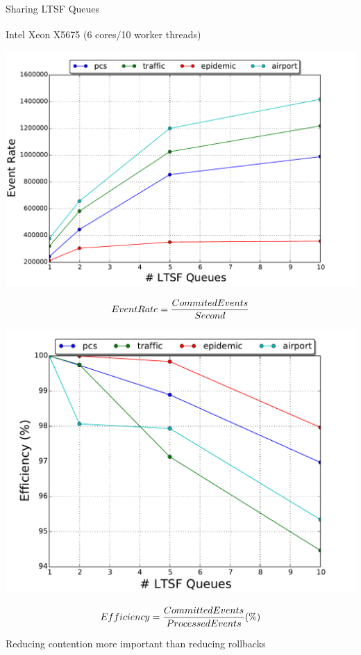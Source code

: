 \documentclass[10pt]{beamer}
\begin{document}
\begin{frame}{Sharing LTSF Queues}
  \bigskip
  \bigskip
    \begin{block}{Intel\textsuperscript{\textregistered} Xeon\textsuperscript{\textregistered} X5675 (6 cores/10 worker threads)}\end{block}
    \vspace*{-\medskipamount}
    \begin{minipage}{0.55\textwidth}
        \centerline{\includegraphics[width=\textwidth]{../figs/pending_event_set/ltsf_event_rate.pdf}}
        \vspace*{-\medskipamount}
        \small{$$EventRate={CommitedEvents \over Second}$$}
    \end{minipage}%
    \begin{minipage}{0.55\textwidth}
        \centerline{\includegraphics[width=\textwidth]{../figs/pending_event_set/ltsf_efficiency.pdf}}
        \vspace*{-\bigskipamount}
        \small{$$Efficiency={CommittedEvents \over ProcessedEvents} (\%)$$}
    \end{minipage}
    \begin{block}{Reducing contention more important than reducing rollbacks}\end{block}
\end{frame}
\end{document}
